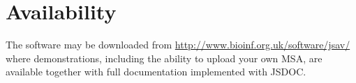 \documentclass[a4]{bioinfo}
\begin{document}
\section{Availability}
The software may be downloaded from
\url{http://www.bioinf.org.uk/software/jsav/} where demonstrations,
including the ability to upload your own MSA, are available together
with full documentation implemented with JSDOC.


\end{document}
